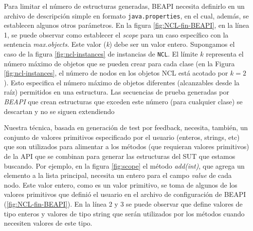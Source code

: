 Para limitar el número de estructuras generadas, BEAPI necesita definirlo en un archivo de descripción simple en formato \texttt{java.properties}, en el cual, además, se establecen algunos otros parámetros. En la figura \ref{fig:NCL-fin-BEAPI}, en la línea 1, se puede observar como establecer el \emph{scope} para un caso específico con la sentencia \emph{max.objects}. Este valor (\emph{k}) debe ser un valor entero. Supongamos el caso de la figura \ref{fig:ncl-instances} de instancias de \texttt{NCL}.  El límite $k$ representa el número máximo de objetos que se pueden crear para cada clase (en la Figura \ref{fig:ncl-instances}, el número de nodos en los objetos NCL está acotado por $k=2$). Esto especifica el número máximo de objetos diferentes (alcanzables desde la raíz) permitidos en una estructura. Las secuencias de prueba generadas por \emph{BEAPI} que crean estructuras que exceden este número (para cualquier clase) se descartan y no se siguen extendiendo

Nuestra técnica, basada en generación de test por feedback, necesita, también, un conjunto de valores primitivos especificado por el usuario (enteros, strings, etc) que son utilizados para alimentar a los métodos (que requieran valores primitivos) de la API que se combinan para generar las estructuras del SUT que estamos buscando.
Por ejemplo, en la figura \ref{fig:scope}  el método \emph{add(int)}, que agrega un elemento a la lista principal, necesita un entero para el campo \emph{value} de cada nodo. Este valor entero, como es un valor primitivo, se toma de algunos de los valores primitivos que definió el usuario en el archivo de configuración de BEAPI (\ref{fig:NCL-fin-BEAPI}). En la línea 2 y 3 se puede observar que define valores de tipo enteros y valores de tipo string que serán utilizados por los métodos cuando necesiten valores de este tipo. 

